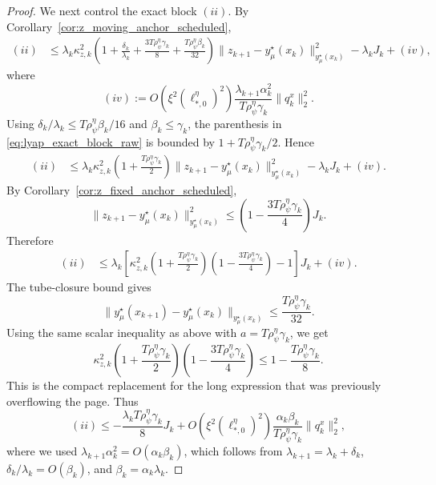 \documentclass{article}
\begin{document}
\begin{proof}
We next control the exact block \((ii)\). By
Corollary~\ref{cor:z_moving_anchor_scheduled},
\begin{align}
(ii)
&\le
\lambda_k\kappa_{z,k}^2
\left(
1+\frac{\delta_k}{\lambda_k}
+\frac{3T\rho_\psi^\eta\gamma_k}{8}
+\frac{T\rho_\psi^\eta\beta_k}{32}
\right)
\big\|z_{k+1}-y_\mu^\star(x_k)\big\|_{y_\mu^\star(x_k)}^2
-\lambda_k J_k
+
(iv),
\label{eq:lyap_exact_block_raw}
\end{align}
where
\begin{equation}
\label{eq:lyap_exact_remainder}
(iv)
:=
O\!\left(\xi^2(\ell_{*,0}^\eta)^2\right)
\frac{\lambda_{k+1}\alpha_k^2}{T\rho_\psi^\eta\gamma_k}\|q_k^x\|_2^2 .
\end{equation}
Using \(\delta_k/\lambda_k\le T\rho_\psi^\eta\beta_k/16\) and \(\beta_k\le\gamma_k\), the parenthesis
in \eqref{eq:lyap_exact_block_raw} is bounded by \(1+T\rho_\psi^\eta\gamma_k/2\). Hence
\begin{align}
(ii)
&\le
\lambda_k\kappa_{z,k}^2
\left(1+\frac{T\rho_\psi^\eta\gamma_k}{2}\right)
\big\|z_{k+1}-y_\mu^\star(x_k)\big\|_{y_\mu^\star(x_k)}^2
-\lambda_kJ_k
+
(iv).
\label{eq:lyap_exact_block_simplified}
\end{align}
By Corollary~\ref{cor:z_fixed_anchor_scheduled},
\[
\big\|z_{k+1}-y_\mu^\star(x_k)\big\|_{y_\mu^\star(x_k)}^2
\le
\left(1-\frac{3T\rho_\psi^\eta\gamma_k}{4}\right)J_k .
\]
Therefore
\begin{align}
(ii)
&\le
\lambda_k
\left[
\kappa_{z,k}^2
\left(1+\frac{T\rho_\psi^\eta\gamma_k}{2}\right)
\left(1-\frac{3T\rho_\psi^\eta\gamma_k}{4}\right)
-1
\right]J_k
+
(iv).
\label{eq:lyap_exact_block_after_contraction}
\end{align}
The tube-closure bound gives
\[
\big\|y_\mu^\star(x_{k+1})-y_\mu^\star(x_k)\big\|_{y_\mu^\star(x_k)}
\le
\frac{T\rho_\psi^\eta\gamma_k}{32}.
\]
Using the same scalar inequality as above with \(a=T\rho_\psi^\eta\gamma_k\), we get
\begin{equation}
\label{eq:lyap_exact_scalar_absorption}
\kappa_{z,k}^2
\left(1+\frac{T\rho_\psi^\eta\gamma_k}{2}\right)
\left(1-\frac{3T\rho_\psi^\eta\gamma_k}{4}\right)
\le
1-\frac{T\rho_\psi^\eta\gamma_k}{8}.
\end{equation}
This is the compact replacement for the long expression that was previously overflowing the page.
Thus
\begin{equation}
\label{eq:lyap_exact_block_final}
(ii)
\le
-\frac{\lambda_kT\rho_\psi^\eta\gamma_k}{8}J_k
+
O\!\left(\xi^2(\ell_{*,0}^\eta)^2\right)
\frac{\alpha_k\beta_k}{T\rho_\psi^\eta\gamma_k}\|q_k^x\|_2^2,
\end{equation}
where we used \(\lambda_{k+1}\alpha_k^2=O(\alpha_k\beta_k)\), which follows from
\(\lambda_{k+1}=\lambda_k+\delta_k\), \(\delta_k/\lambda_k=O(\beta_k)\), and
\(\beta_k=\alpha_k\lambda_k\).


\end{proof}
\end{document}
